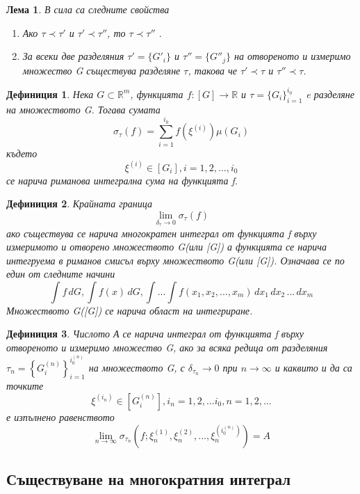 \documentclass[a4paper,fleqn,12pt]{article}
\newtheorem{lemma}{Лема}[subsection]
\newtheorem{definition}{Дефиниция}[subsection]
\theoremstyle{definition}
\begin{document}
\begin{lemma}
В сила са следните свойства

\begin{enumerate}
\item Ако $\tau \prec \tau'$ и $\tau' \prec \tau''$, то $\tau \prec \tau''$ .
\item За всеки две разделяния $\tau' = \{ G'_i\}$ и $\tau'' = \{ G''_j\}$ на отвореното и измеримо множество G съществува разделяне $\tau$, такова че $\tau' \prec \tau$ и $\tau'' \prec \tau$.
\end{enumerate}

\end{lemma}

\begin{definition}
Нека $G \subset \mathbb{R}^m$, функцията $f: [G] \to \mathbb{R}$ и $\tau = \{ G_i\}_{i=1}^{i_0}$ e разделяне на множеството G. Тогава сумата 
$$\sigma_\tau (f) = \sum_{i=1} ^{i_0} f(\xi^{(i)})\mu(G_i)$$
където 
$$\xi^{(i)} \in [G_i], i = 1,2,..., i_0$$
се нарича риманова интегрална сума на функцията f. 
\end{definition}

\begin{definition}
Крайната граница 
$$\lim\limits_{\delta_\tau \to 0} \sigma_\tau (f)$$
ако съществува се нарича многократен интеграл от функцията f върху измеримото и отворено множеството G(или [G]) а функцията се нарича интегруема в риманов смисъл върху множеството G(или [G]). Означава се по един от следните начини 
$$\int f \, dG, \int f(x) \,dG, \int ... \int f(x_1, x_2,..., x_m) \,dx_1 \, dx_2 \, ... \, dx_m$$
Множеството G([G]) се нарича област на интегриране.
\end{definition}

\begin{definition}
Числото А се нарича интеграл от функцията f върху отвореното и измеримо множество G, ако за всяка редица от разделяния $\tau_n = \left \{ G_i ^{(n)}\right \}_{i=1} ^{i_0 ^{(n)}}$ на множеството G, с $\delta_{\tau_n} \to 0$ при $n \to \infty$ и каквито и да са точките
$$\xi^{(i_n)} \in [G_i ^{(n)}], i_n = 1,2,... i_0 , n = 1,2,...$$
е изпълнено равенството 
$$\lim\limits_{n \to \infty} \sigma_{\tau_n} (f;\xi_n ^{(1)}, \xi_n ^{(2)}, ..., \xi_n ^{(i_0 ^ {(n)})}) =  A$$
\end{definition}

\subsection{Съществуване на многократния интеграл}
\end{document}
